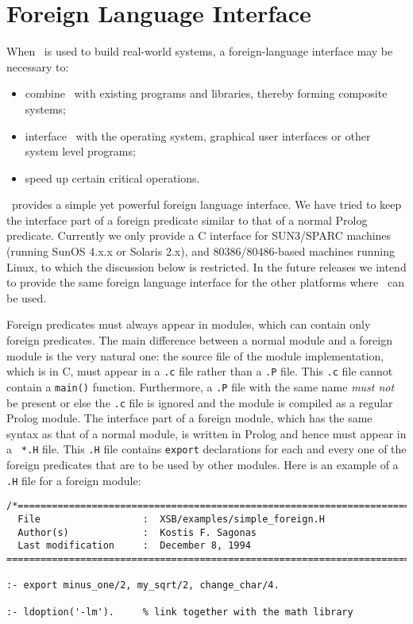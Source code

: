 \chapter{Foreign Language Interface}
\label{foreign}

When \ourprolog\ is used to build real-world systems, a foreign-language
interface may be necessary to:
\begin{itemize}
\item combine \ourprolog\ with existing programs and libraries, thereby
      forming composite systems;
\item interface \ourprolog\ with the operating system, graphical user 
      interfaces or other system level programs;
\item speed up certain critical operations.
\end{itemize}

\ourprolog\ provides a simple yet powerful foreign language interface.
We have tried to keep the interface part of a foreign predicate similar
to that of a normal Prolog predicate.  Currently we only provide a C 
interface for SUN3/SPARC machines (running SunOS 4.x.x or Solaris 2.x),
and 80386/80486-based machines running Linux, to which the discussion
below is restricted.  In the future releases we intend to provide the
same foreign language interface for the other platforms where \ourprolog\
can be used.

Foreign predicates must always appear in modules, which can contain
only foreign predicates.  The main difference between a normal module
and a foreign module is the very natural one: the source file of the
module implementation, which is in C, must appear in a {\tt *.c} file
rather than a {\tt *.P} file.  This {\tt *.c} file cannot contain a
{\tt main()} function.  Furthermore, a {\tt *.P} file with the same
name {\em must not} be present or else the {\tt *.c} file is ignored
and the module is compiled as a regular Prolog module.  The interface
part of a foreign module, which has the same syntax as that of a
normal module, is written in Prolog and hence must appear in a {\tt
*.H} file.  This {\tt *.H} file contains {\tt export} declarations
for each and every one of the foreign predicates that are to be used
by other modules.  Here is an example of a {\tt .H} file for a foreign
module:

\begin{verbatim}
/*======================================================================
  File                  :  XSB/examples/simple_foreign.H
  Author(s)             :  Kostis F. Sagonas
  Last modification     :  December 8, 1994
========================================================================*/

:- export minus_one/2, my_sqrt/2, change_char/4.

:- ldoption('-lm').     % link together with the math library
\end{verbatim}

